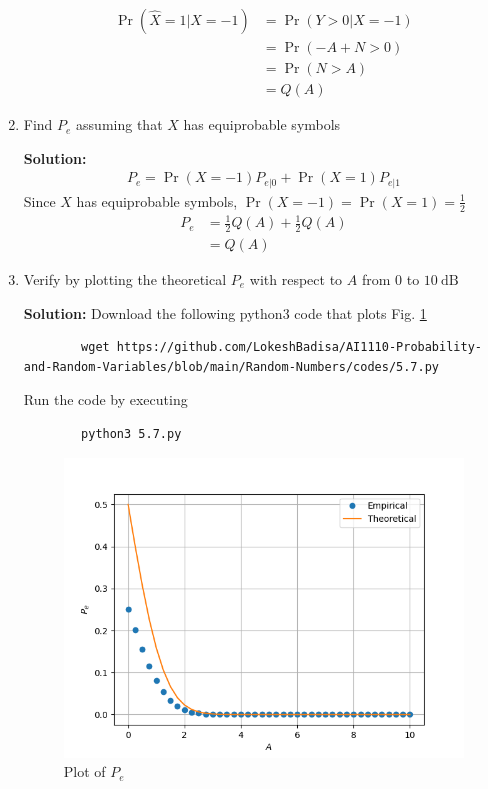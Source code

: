 \documentclass[journal,12pt,twocolumn]{IEEEtran}
\newcommand{\solution}{\noindent \textbf{Solution: }}
\providecommand{\pr}[1]{\ensuremath{\Pr\left(#1\right)}}
\numberwithin{equation}{section}
\renewcommand\thesection{\arabic{section}}
\begin{document}
\begin{enumerate}[label=\thesection.\arabic*,ref=\thesection.\theenumi]
	\begin{align}
		\pr{\hat{X}=1|X=-1} &= \pr{Y>0|X=-1} \\
		&= \pr{-A+N>0} \\
		&= \pr{N>A} \\
		&= Q(A)		
	\end{align}
	
	\item Find $P_e$ assuming that $X$ has equiprobable symbols
	
	\solution 
	\begin{align}
		P_e = \pr{X=-1} P_{e|0} + \pr{X=1} P_{e|1}
	\end{align}
	Since $X$ has equiprobable symbols, $\pr{X=-1} = \pr{X=1} = \frac12$
	\begin{align}
		P_e &= \frac12 Q(A) + \frac12 Q(A) \\
		&= Q(A)	
	\end{align}		
	
	\item Verify by plotting the theoretical $P_e$ with respect to $A$ from $0$ to $10 ~\mathrm{dB}$
	
	\solution Download the following python3 code that plots Fig. \ref{fig-5.7}
	\begin{lstlisting}
		wget https://github.com/LokeshBadisa/AI1110-Probability-and-Random-Variables/blob/main/Random-Numbers/codes/5.7.py
	\end{lstlisting}
	Run the code by executing
	\begin{lstlisting}
		python3 5.7.py
	\end{lstlisting}
	\begin{figure}
		\centering
		\includegraphics[width=\columnwidth]{./figs/5.7.png}
		\caption{Plot of $P_e$}
		\label{fig-5.7}
	\end{figure}
	

\end{enumerate}
\end{document}
